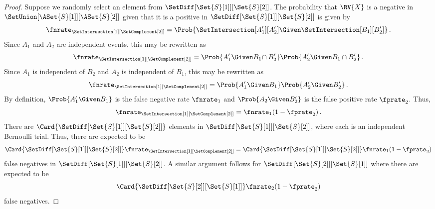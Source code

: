 \documentclass[ ../main.tex]{subfiles}
\begin{document}
{\begin{proof}
Suppose we randomly select an element from $\SetDiff[\Set{S}[1]][\Set{S}[2]]$. The probability that $\RV{X}$ is a negative in $\SetUnion[\ASet{S}[1]][\ASet{S}[2]]$ given that it is a positive in $\SetDiff[\Set{S}[1]][\Set{S}[2]]$ is given by
\begin{equation}
    \fnrate_{\SetIntersection[1][\SetComplement[2]]} = \Prob{\SetIntersection[A_1'][A_2'] \Given \SetIntersection[B_1][B_2']}\,.
\end{equation}
Since $A_1$ and $A_2$ are independent events, this may be rewritten as
\begin{equation}
    \fnrate_{\SetIntersection[1][\SetComplement[2]]} = \Prob{A_1' \Given B_1 \! \cap B_2'} \Prob{A_2' \Given B_1 \cap B_2'}\,.
\end{equation}
Since $A_1$ is independent of $B_2$ and $A_2$ is independent of $B_1$, this may be rewritten as
\begin{equation}
    \fnrate_{\SetIntersection[1][\SetComplement[2]]} = \Prob{A_1' \Given B_1} \Prob{A_2' \Given B_2'}\,.
\end{equation}
By definition, $\Prob{A_1' \Given B_1}$ is the false negative rate $\fnrate_1$ and $\Prob{A_2 \Given B_2'}$ is the false positive rate $\fprate_2$. Thus,
\begin{equation}
    \fnrate_{\SetIntersection[1][\SetComplement[2]]} = \fnrate_1 (1 - \fprate_2)\,.
\end{equation}
There are $\Card{\SetDiff[\Set{S}[1]][\Set{S}[2]]}$ elements in $\SetDiff[\Set{S}[1]][\Set{S}[2]]$, where each is an independent Bernoulli trial. Thus, there are expected to be
\begin{equation}
\label{eq:proof_union_fn_2}
    \Card{\SetDiff[\Set{S}[1]][\Set{S}[2]]} \fnrate_{\SetIntersection[1][\SetComplement[2]]} = \Card{\SetDiff[\Set{S}[1]][\Set{S}[2]]} \fnrate_1 (1 - \fprate_2)
\end{equation}
false negatives in $\SetDiff[\Set{S}[1]][\Set{S}[2]]$. A similar argument follows for $\SetDiff[\Set{S}[2]][\Set{S}[1]]$ where there are expected to be
\begin{equation}
\label{eq:proof_union_fn_3}
    \Card{\SetDiff[\Set{S}[2]][\Set{S}[1]]} \fnrate_2(1 - \fprate_2)
\end{equation}
false negatives.


\end{proof}}
\end{document}
